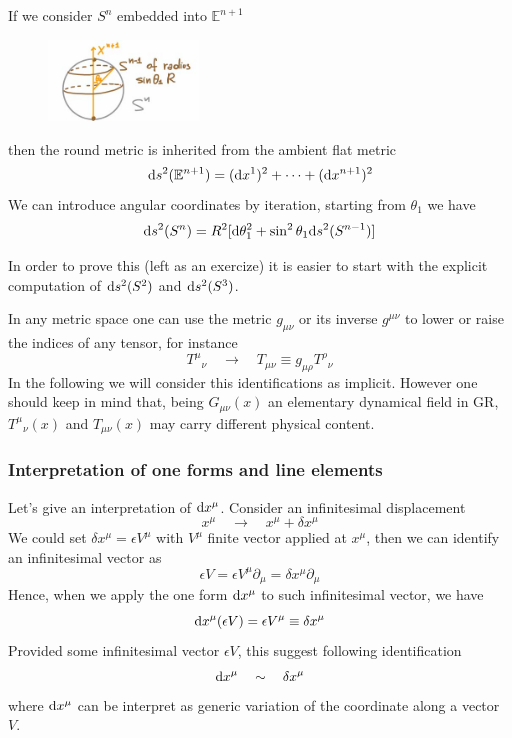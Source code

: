 \documentclass[../main/main.tex]{subfiles}
\begin{document}
\begin{example}
If we consider $S^n$ embedded into $\mathbb E^{n+1}$ 
\begin{figure}[H]
\centering
\includegraphics[width=4cm]{../img/round-metric-sn.jpg}
\end{figure}
then the round metric is inherited from the ambient flat metric
\[\textup{d} s^2(\mathbb E^{n+1})=(\textup{d} x^1)^2+\dots+(\textup{d} x^{n+1})^2\]
We can introduce angular coordinates by iteration, starting from $\theta_1$ we have
\[\textup{d} s^2(S^n)=R^2[\textup{d}\theta_1^2+\sin^2\theta_1\textup{d} s^2(S^{n-1})]\]

In order to prove this (left as an exercize) it is easier to start with the explicit computation of $\textup{d} s^2(S^2)$ and $\textup{d} s^2(S^3)$. 

\end{example}


In any metric space one can use the metric $g_{\mu\nu}$ or its inverse $g^{\mu\nu}$ to lower or raise the indices of any tensor, for instance
\[{T^\mu}_\nu\quad\longrightarrow\quad T_{\mu\nu}\equiv g_{\mu\rho}{T^\rho}_\nu\]
In the following we will consider this identifications as implicit. However one should keep in mind that, being $G_{\mu\nu}(x)$ an elementary dynamical field in GR, ${T^\mu}_\nu(x)$ and $T_{\mu\nu}(x)$ may carry different physical content.

\subsubsection{Interpretation of one forms and line elements}
Let's give an interpretation of $\textup{d} x^\mu$. Consider an infinitesimal displacement 
\[x^\mu\quad\longrightarrow\quad x^\mu+\delta x^\mu\]
We could set $\delta x^\mu=\epsilon V^\mu$ with $V^\mu$ finite vector applied at $x^\mu$, then we can identify an infinitesimal vector as
\[\epsilon V=\epsilon V^\mu\partial_\mu=\delta x^\mu\partial_\mu\]
Hence, when we apply the one form $\textup{d} x^\mu$ to such infinitesimal vector, we have
\[\de x^\mu(\epsilon V)=\epsilon V^\mu\equiv\delta x^\mu\]
Provided some infinitesimal vector $\epsilon V$, this suggest following identification
\[\textup{d} x^\mu\quad\sim\quad\delta x^\mu\]
where $\textup{d} x^\mu$ can be interpret as generic variation of the coordinate along a vector $V$.
\end{document}
